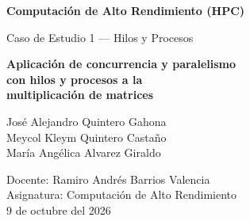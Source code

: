 \begin{titlepage}
    \centering
    \vspace*{2cm}

    {\Large\bfseries Computación de Alto Rendimiento (HPC)\par}
    \vspace{0.5cm}
    {\Large Caso de Estudio 1 --- Hilos y Procesos\par}

    \vspace{2cm}

    {\Huge\bfseries Aplicación de concurrencia y paralelismo\\ con hilos y procesos a la\\ multiplicación de matrices\par}

    \vspace{2cm}

    {\Large
    José Alejandro Quintero Gahona\\[0.3cm]
    Meycol Kleym Quintero Castaño\\[0.3cm]
    María Angélica Alvarez Giraldo\\[0.3cm]
    }

    \vfill

    {\large
    Docente: Ramiro Andrés Barrios Valencia\\[0.3cm]
    Asignatura: Computación de Alto Rendimiento\\[0.3cm]
    9 de octubre del 2026
    \par}
\end{titlepage}